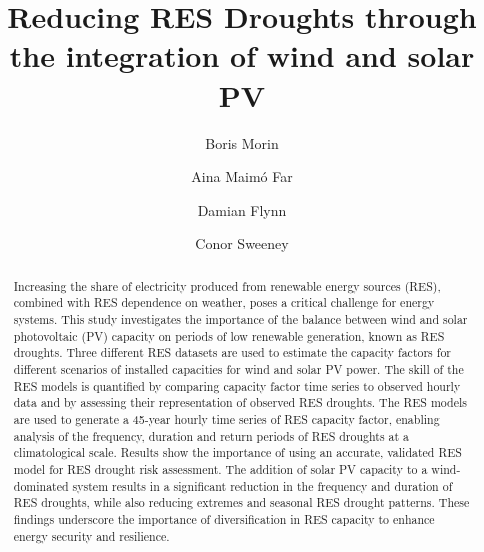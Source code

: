 \documentclass[preprint, 12pt]{elsarticle}
\begin{document}
\begin{frontmatter}
	

\title{Reducing RES Droughts through the integration of wind and solar PV}

\author[Math]{Boris Morin }

\author[Math]{Aina Maimó Far}

\author[Eng]{Damian Flynn}

\author[Math]{Conor Sweeney}




\begin{abstract}
Increasing the share of electricity produced from renewable energy sources (RES), combined with RES dependence on weather, poses a critical challenge for energy systems. This study investigates the importance of the balance between wind and solar photovoltaic (PV) capacity on periods of low renewable generation, known as RES droughts. Three different RES datasets are used to estimate the capacity factors for different scenarios of installed capacities for wind and solar PV power. The skill of the RES models is quantified by comparing capacity factor time series to observed hourly data and by assessing their representation of observed RES droughts. The RES models are used to generate a 45-year hourly time series of RES capacity factor, enabling analysis of the frequency, duration and return periods of RES droughts at a climatological scale. Results show the importance of using an accurate, validated RES model for RES drought risk assessment. The addition of solar PV capacity to a wind-dominated system results in a significant reduction in the frequency and duration of RES droughts, while also reducing extremes and seasonal RES drought patterns. These findings underscore the importance of diversification in RES capacity to enhance energy security and resilience.
\end{abstract}


\end{frontmatter}
\end{document}
